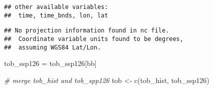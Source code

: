 \documentclass[
]{article}
\newenvironment{Shaded}{\begin{snugshade}}{\end{snugshade}}
\newcommand{\CommentTok}[1]{\textcolor[rgb]{0.56,0.35,0.01}{\textit{#1}}}
\newcommand{\FunctionTok}[1]{\textcolor[rgb]{0.00,0.00,0.00}{#1}}
\newcommand{\NormalTok}[1]{#1}
\newcommand{\OtherTok}[1]{\textcolor[rgb]{0.56,0.35,0.01}{#1}}
\begin{document}
\begin{verbatim}
## other available variables:
##  time, time_bnds, lon, lat
\end{verbatim}

\begin{verbatim}
## No projection information found in nc file. 
##  Coordinate variable units found to be degrees, 
##  assuming WGS84 Lat/Lon.
\end{verbatim}

\begin{Shaded}
\begin{Highlighting}[]
\NormalTok{tob\_ssp126 }\OtherTok{=}\NormalTok{ tob\_ssp126[bb]}

\CommentTok{\# merge tob\_hist and tob\_spp126}
\NormalTok{tob }\OtherTok{\textless{}{-}} \FunctionTok{c}\NormalTok{(tob\_hist, tob\_ssp126)}
\end{Highlighting}
\end{Shaded}
\end{document}
